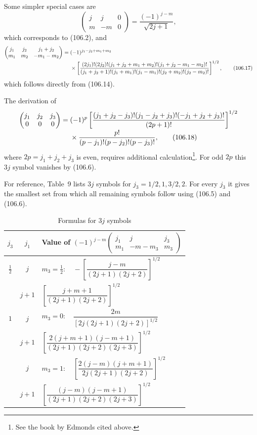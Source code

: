 Some simpler special cases are
\begin{equation}
 \begin{pmatrix}j&j&0\\m&-m&0\end{pmatrix}=\frac{(-1)^{j-m}}{\sqrt{2j+1}},
 \tag{106.16}
\end{equation}
which corresponds to (106.2), and
\begingroup\small
\begin{align}
\begin{pmatrix}j_1&j_2&j_1+j_2\\m_1&m_2&-m_1-m_2\end{pmatrix}
={}&(-1)^{j_1-j_2+m_1+m_2}\notag\\[-2pt]
&\times\left[\frac{(2j_1)!(2j_2)!(j_1+j_2+m_1+m_2)!(j_1+j_2-m_1-m_2)!}{(j_1+j_2+1)!(j_1+m_1)!(j_1-m_1)!(j_2+m_2)!(j_2-m_2)!}\right]^{1/2},
\tag{106.17}
\end{align}
\endgroup
which follows directly from (106.14).

The derivation of
\begin{align}
\begin{pmatrix}j_1&j_2&j_3\\0&0&0\end{pmatrix}
={}&(-1)^p\left[\frac{(j_1+j_2-j_3)!(j_1-j_2+j_3)!(-j_1+j_2+j_3)!}{(2p+1)!}\right]^{1/2}\notag\\[-2pt]
&\times\frac{p!}{(p-j_1)!(p-j_2)!(p-j_3)!},
\tag{106.18}
\end{align}
where $2p=j_1+j_2+j_3$ is even, requires additional calculation\footnote{See the book by Edmonds cited above.}. For odd $2p$ this $3j$ symbol vanishes by (106.6).

For reference, Table~9 lists $3j$ symbols for $j_3=1/2,1,3/2,2$. For every $j_3$ it gives the smallest set from which all remaining symbols follow using (106.5) and (106.6).

\setcounter{table}{8}
\begin{table}[htbp]
\centering\small
\caption{Formulas for $3j$ symbols}
\renewcommand{\arraystretch}{1.55}
\begin{tabular}{@{}c c l@{}}
\toprule
$j_3$ & $j_1$ & \multicolumn{1}{c}{Value of $(-1)^{j-m}\begin{pmatrix}j_1&j&j_3\\m_1&-m-m_3&m_3\end{pmatrix}$}\\
\midrule
$\frac12$ & $j$ & $m_3=\frac12:\quad -\left[\dfrac{j-m}{(2j+1)(2j+2)}\right]^{1/2}$\\
 & $j+1$ & $\left[\dfrac{j+m+1}{(2j+1)(2j+2)}\right]^{1/2}$\\
\midrule
$1$ & $j$ & $m_3=0:\quad \dfrac{2m}{[2j(2j+1)(2j+2)]^{1/2}}$\\
 & $j+1$ & $\left[\dfrac{2(j+m+1)(j-m+1)}{(2j+1)(2j+2)(2j+3)}\right]^{1/2}$\\
 & $j$ & $m_3=1:\quad \left[\dfrac{2(j-m)(j+m+1)}{2j(2j+1)(2j+2)}\right]^{1/2}$\\
 & $j+1$ & $\left[\dfrac{(j-m)(j-m+1)}{(2j+1)(2j+2)(2j+3)}\right]^{1/2}$\\
\bottomrule
\end{tabular}
\end{table}

